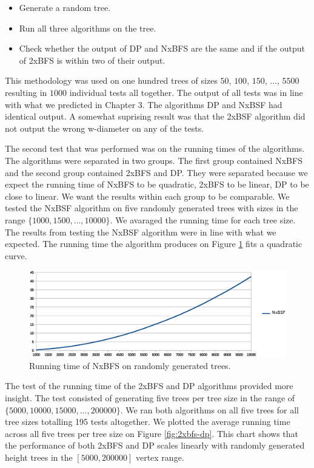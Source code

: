 \begin{itemize}
    \item Generate a random tree.
    \item Run all three algorithms on the tree.
    \item Check whether the output of DP and NxBFS are the same and if the output of 2xBFS is within two of their output.
\end{itemize}

This methodology was used on one hundred trees of sizes $50$, $100$, $150$, ..., $5500$ resulting in $1000$ individual tests all together. The output of all tests was in line with what we predicted in Chapter 3. The algorithms DP and NxBSF had identical output. A somewhat suprising result was that the 2xBSF algorithm did not output the wrong w-diameter on any of the tests.

The second test that was performed was on the running times of the algorithms. The algorithms were separated in two groups. The first group contained NxBFS and the second group contained 2xBFS and DP. They were separated because we expect the running time of NxBFS to be quadratic, 2xBFS to be linear, DP to be close to linear. We want the results within each group to be comparable. We tested the NxBSF algorithm on five randomly generated trees with sizes in the range $\{1000, 1500, ..., 10000\}$. We avaraged the running time for each tree size. The results from testing the NxBSF algorithm were in line with what we expected. The running time the algorithm produces on Figure \ref{fig:nbfs} fits a quadratic curve.

\begin{figure}[h]%
    \centering
    \includegraphics[center, scale=0.6 ]{./images/empirical/chart-nbfs.eps}
    \caption{Running time of NxBFS on randomly generated trees. }%
    \label{fig:nbfs}%
\end{figure}


The test of the running time of the 2xBFS and DP algorithms provided more insight. The test consisted of generating five trees per tree size in the range of $\{5000, 10000, 15000, ..., 200000\}$. We ran both algorithms on all five trees for all tree sizes totalling 195 tests altogether. We plotted the average running time across all five trees per tree size on Figure \ref{fig:2xbfs-dp}. This chart shows that the performance of both 2xBFS and DP scales linearly with randomly generated height trees in the $[5000, 200000]$ vertex range.

